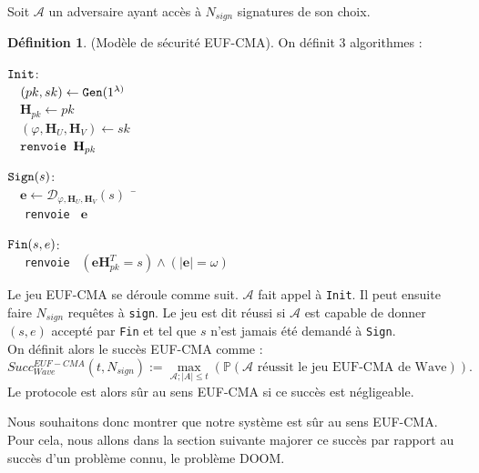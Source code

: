 \documentclass[12pt]{article}
\theoremstyle{definition}
\newtheorem{defi}[thm]{Définition}
\begin{document}
Soit $\mathcal{A}$ un adversaire ayant accès à $N_{sign}$ signatures de son choix.
\begin{defi} (Modèle de sécurité EUF-CMA). On définit 3 algorithmes :
\begin{multicols}{2}
\begin{flushleft}
$\verb|Init|$:\\
	$\quad (pk,sk) \leftarrow \verb|Gen|(1^{\lambda)}$ \\
	$\quad \mathbf{H}_{pk} \leftarrow pk$ \\
	$\quad (\varphi, \mathbf{H}_{U},\mathbf{H}_{V}) \leftarrow sk$ \\
	$\quad \verb|renvoie | \mathbf{H}_{pk}$ \\
\end{flushleft}
\begin{flushleft}
$\verb|Sign|(s)$: \\
	$\quad \mathbf{e} \leftarrow \mathcal{D}_{\varphi,\mathbf{H}_{U},\mathbf{H}_{V}}(s)$ ¯\\
	$\quad$ \verb|renvoie | $\mathbf{e}$
\end{flushleft}
\begin{flushleft}
$\verb|Fin|(s,e)$: \\
	$\quad$ \verb|renvoie | $(\mathbf{e}\mathbf{H}_{pk}^T = s) \land (|\mathbf{e}| = \omega)$
\end{flushleft}
\end{multicols}
Le jeu EUF-CMA se déroule comme suit. $\mathcal{A}$ fait appel à \verb|Init|. Il peut ensuite faire $N_{sign}$ requêtes à \verb|sign|. Le jeu est dit réussi si $\mathcal{A}$ est capable de donner $(s,e)$ accepté par \verb|Fin| et tel que $s$ n'est jamais été demandé à \verb|Sign|. \\
On définit alors le succès EUF-CMA comme :
$$Succ^{EUF-CMA}_{Wave}(t,N_{sign}) := \max_{\mathcal{A};|A|\leq t}(\mathbb{P}(\mathcal{A}\text{ réussit le jeu EUF-CMA de Wave})).$$
Le protocole est alors sûr au sens EUF-CMA si ce succès est négligeable.
\end{defi}

Nous souhaitons donc montrer que notre système est sûr au sens EUF-CMA. Pour cela, nous allons dans la section suivante majorer ce succès par rapport au succès d'un problème connu, le problème DOOM.
\end{document}
